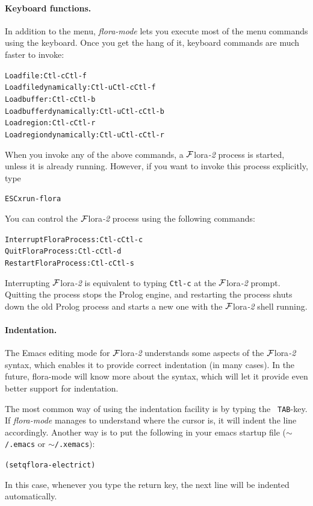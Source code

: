 \documentclass[11pt]{article}
\newcommand{\FLORA}{{\mbox{\sc ${\cal F}${lora}\rm\emph{-2}}}\xspace}
\newcommand{\FLSYSTEM}{\FLORA}
\begin{document}
{\paragraph{Keyboard functions.}
In addition to the menu, \emph{flora-mode} lets you execute most of the
menu commands using the keyboard. Once you get the hang of it, keyboard
commands are much faster to invoke:
\begin{alltt}
Load file:                 Ctl-c Ctl-f\\
Load file dynamically:     Ctl-u Ctl-c Ctl-f\\
Load buffer:               Ctl-c Ctl-b\\
Load buffer dynamically:   Ctl-u Ctl-c Ctl-b\\
Load region:               Ctl-c Ctl-r\\
Load region dynamically:   Ctl-u Ctl-c Ctl-r
\end{alltt}
When you invoke any of the above commands, a \FLSYSTEM process is started,
unless it is already running. However, if you want to invoke this process
explicitly, type
\begin{alltt}
ESC x run-flora  
\end{alltt}
You can control the \FLSYSTEM process using the following commands:
\begin{alltt}
Interrupt Flora Process:      Ctl-c Ctl-c\\
Quit Flora Process:           Ctl-c Ctl-d\\
Restart Flora Process:        Ctl-c Ctl-s\\
\end{alltt}
Interrupting \FLSYSTEM is equivalent to typing {\tt Ctl-c} at the \FLSYSTEM
prompt. Quitting the process stops the Prolog engine, and restarting the
process shuts down the old Prolog process and starts a new one with the \FLSYSTEM
shell running. 

\paragraph{Indentation.}
The Emacs editing mode for \FLSYSTEM
understands some aspects of the \FLSYSTEM syntax, which
enables it to provide correct indentation (in many cases).
In the future, flora-mode will know more about the syntax, which will let
it provide even better support for indentation.

The most common way of using the indentation facility is by typing the {\tt
  TAB}-key. If \emph{flora-mode} manages to understand where the cursor is,
it will indent the line accordingly. Another way is to put the following in
your emacs startup file (\texttt{\ensuremath{\sim}/.emacs} or  \texttt{\ensuremath{\sim}/.xemacs}):
\begin{alltt}
    (setq flora-electric t)  
\end{alltt}
In this case, whenever you type the return key, the next line will be
indented automatically.

}
\end{document}
